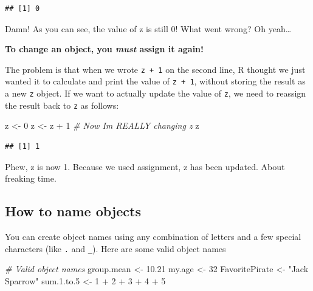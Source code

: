 \documentclass[
]{book}
\newenvironment{Shaded}{\begin{snugshade}}{\end{snugshade}}
\newcommand{\CommentTok}[1]{\textcolor[rgb]{0.56,0.35,0.01}{\textit{#1}}}
\newcommand{\DecValTok}[1]{\textcolor[rgb]{0.00,0.00,0.81}{#1}}
\newcommand{\FloatTok}[1]{\textcolor[rgb]{0.00,0.00,0.81}{#1}}
\newcommand{\NormalTok}[1]{#1}
\newcommand{\OtherTok}[1]{\textcolor[rgb]{0.56,0.35,0.01}{#1}}
\newcommand{\SpecialCharTok}[1]{\textcolor[rgb]{0.00,0.00,0.00}{#1}}
\newcommand{\StringTok}[1]{\textcolor[rgb]{0.31,0.60,0.02}{#1}}
\begin{document}
\begin{verbatim}
## [1] 0
\end{verbatim}

Damn! As you can see, the value of z is still 0! What went wrong? Oh yeah\ldots{}

\textbf{To change an object, you \emph{must} assign it again!}

The problem is that when we wrote \texttt{z\ +\ 1} on the second line, R thought we just wanted it to calculate and print the value of \texttt{z\ +\ 1}, without storing the result as a new \texttt{z} object. If we want to actually update the value of \texttt{z}, we need to reassign the result back to \texttt{z} as follows:

\begin{Shaded}
\begin{Highlighting}[]
\NormalTok{z }\OtherTok{\textless{}{-}} \DecValTok{0}
\NormalTok{z }\OtherTok{\textless{}{-}}\NormalTok{ z }\SpecialCharTok{+} \DecValTok{1}  \CommentTok{\# Now I\textquotesingle{}m REALLY changing z}
\NormalTok{z}
\end{Highlighting}
\end{Shaded}

\begin{verbatim}
## [1] 1
\end{verbatim}

Phew, z is now 1. Because we used assignment, z has been updated. About freaking time.

\hypertarget{how-to-name-objects}{%
\subsection{How to name objects}\label{how-to-name-objects}}

You can create object names using any combination of letters and a few special characters (like \texttt{.} and \texttt{\_}). Here are some valid object names

\begin{Shaded}
\begin{Highlighting}[]
\CommentTok{\# Valid object names}
\NormalTok{group.mean }\OtherTok{\textless{}{-}} \FloatTok{10.21}
\NormalTok{my.age }\OtherTok{\textless{}{-}} \DecValTok{32}
\NormalTok{FavoritePirate }\OtherTok{\textless{}{-}} \StringTok{"Jack Sparrow"}
\NormalTok{sum.}\FloatTok{1.}\NormalTok{to}\FloatTok{.5} \OtherTok{\textless{}{-}} \DecValTok{1} \SpecialCharTok{+} \DecValTok{2} \SpecialCharTok{+} \DecValTok{3} \SpecialCharTok{+} \DecValTok{4} \SpecialCharTok{+} \DecValTok{5}
\end{Highlighting}
\end{Shaded}
\end{document}
